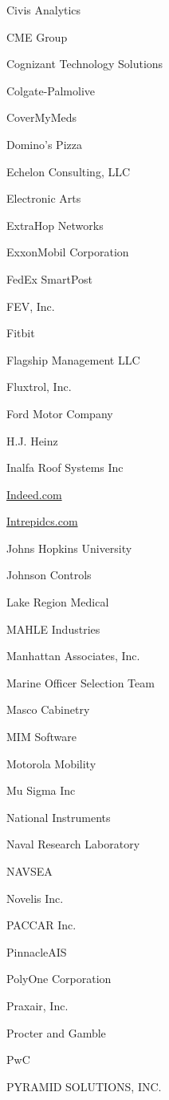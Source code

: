\documentclass[twoside]{article}
\begin{document}
\begin{center}
\begin{multicols}{5}
\begin{FlushLeft}
\begin{compactitem}
\item Civis Analytics
\item CME Group
\item Cognizant Technology Solutions
\item Colgate-Palmolive
\item CoverMyMeds
\item Domino's Pizza
\item Echelon Consulting, LLC
\item Electronic Arts
\item ExtraHop Networks
\item ExxonMobil Corporation
\item FedEx SmartPost
\item FEV, Inc.
\item Fitbit
\item Flagship Management LLC
\item Fluxtrol, Inc.
\item Ford Motor Company
\item H.J. Heinz
\item Inalfa Roof Systems Inc
\item \url{Indeed.com}
\item \url{Intrepidcs.com}
\item Johns Hopkins University
\item Johnson Controls
\item Lake Region Medical
\item MAHLE Industries
\item Manhattan Associates, Inc.
\item Marine Officer Selection Team
\item Masco Cabinetry
\item MIM Software
\item Motorola Mobility
\item Mu Sigma Inc
\item National Instruments
\item Naval Research Laboratory
\item NAVSEA
\item Novelis Inc.
\item PACCAR Inc.
\item PinnacleAIS
\item PolyOne Corporation
\item Praxair, Inc.
\item Procter and Gamble
\item PwC
\item PYRAMID SOLUTIONS, INC.

\end{compactitem}
\end{FlushLeft}
\end{multicols}
\end{center}
\end{document}
